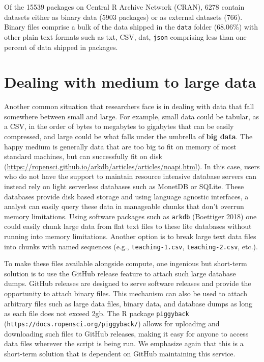 \documentclass[
]{article}
\begin{document}
Of the 15539 packages on Central R Archive Network (CRAN), 6278 contain
datasets either as binary data (5903 packages) or as external datasets
(766). Binary files comprise a bulk of the data shipped in the \texttt{data}
folder (68.06\%) with other plain text formats such as txt, CSV, dat,
\texttt{json} comprising less than one percent of data shipped in packages.

\hypertarget{med-large}{%
\section{Dealing with medium to large data}\label{med-large}}

Another common situation that researchers face is in dealing with data that fall somewhere between small and large. For example, small data could be tabular, as a CSV, in the order of bytes to megabytes to gigabytes that can be easily compressed, and large could be what falls under the umbrella of \textbf{big data}. The happy medium is generally data that are too big to fit on memory of most standard machines, but can successfully fit on disk (\url{https://ropensci.github.io/arkdb/articles/articles/noapi.html}). In this case, users who do not have the support to maintain resource intensive database servers can instead rely on light serverless databases such as MonetDB or SQLite. These databases provide disk based storage and using language agnostic interfaces, a analyst can easily query these data in manageable chunks that don't overrun memory limitations. Using software packages such as \texttt{arkdb} (Boettiger 2018) one could easily chunk large data from flat text files to these lite databases without running into memory limitations. Another option is to break large text data files into chunks with named sequences (e.g., \texttt{teaching-1.csv}, \texttt{teaching-2.csv}, etc.).

To make these files available alongside compute, one ingenious but short-term solution is to use the GitHub release feature to attach such large database dumps. GitHub releases are designed to serve software releases and provide the opportunity to attach binary files. This mechanism can also be used to attach arbitrary files such as large data files, binary data, and database dumps as long as each file does not exceed 2gb. The R package \texttt{piggyback} (\texttt{https://docs.ropensci.org/piggyback/}) allows for uploading and downloading such files to GitHub releases, making it easy for anyone to access data files wherever the script is being run. We emphasize again that this is a short-term solution that is dependent on GitHub maintaining this service.
\end{document}
